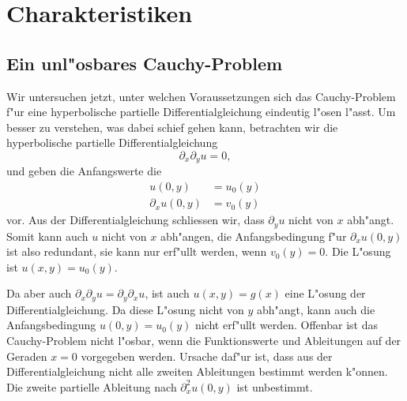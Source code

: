 \section{Charakteristiken}
\subsection{Ein unl"osbares Cauchy-Problem}
Wir untersuchen jetzt, unter welchen Voraussetzungen sich das Cauchy-Problem
f"ur eine hyperbolische partielle Differentialgleichung eindeutig l"osen l"asst.
Um besser zu verstehen, was dabei schief gehen kann, betrachten wir die
hyperbolische partielle Differentialgleichung
\[
\partial_x\partial_y u=0,
\]
und geben die Anfangswerte die
\begin{align*}
u(0,y)&=u_0(y)
\\
\partial_xu(0,y)&=v_0(y)
\end{align*}
vor.
Aus der Differentialgleichung schliessen wir, dass $\partial_y u$
nicht von $x$ abh"angt. Somit kann auch $u$ nicht von $x$ abh"angen,
die Anfangsbedingung f"ur $\partial_xu(0,y)$ ist also redundant,
sie kann nur erf"ullt werden, wenn $v_0(y)=0$.
Die L"osung ist $u(x,y)=u_0(y)$.

Da aber auch $\partial_x\partial_yu=\partial_y\partial_xu$, ist auch
$u(x,y)=g(x)$ eine L"osung der Differentialgleichung. Da diese
L"osung nicht von $y$ abh"angt, kann auch die Anfangsbedingung $u(0,y)=u_0(y)$
nicht erf"ullt werden. Offenbar ist das Cauchy-Problem nicht l"osbar, wenn die
Funktionswerte und Ableitungen auf der Geraden $x=0$ vorgegeben werden.
Ursache daf"ur ist, dass aus der Differentialgleichung nicht alle zweiten
Ableitungen bestimmt werden k"onnen. Die zweite partielle Ableitung
nach $\partial_x^2u(0,y)$ ist unbestimmt.

